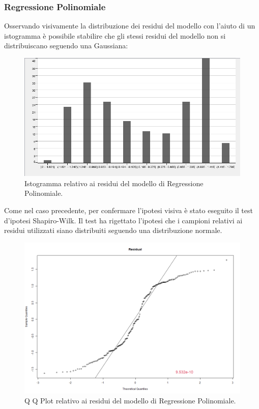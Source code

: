 \documentclass[12pt, a4paper, twocolumn]{article} %
\begin{document}
\subsubsection{Regressione Polinomiale}
Osservando visivamente la distribuzione dei residui del modello con l'aiuto di un istogramma è possibile stabilire che gli stessi residui del modello non si distribuiscano seguendo una Gaussiana:
\begin{figure}[H]
  \includegraphics[scale=0.35]{./Immagini/hist-polinomial-regression.png}
  \caption{Istogramma relativo ai residui del modello di Regressione Polinomiale.}
\end{figure}
Come nel caso precedente, per confermare l'ipotesi visiva è stato eseguito il test d'ipotesi Shapiro-Wilk. Il test ha rigettato l'ipotesi che i campioni relativi ai residui utilizzati siano distribuiti seguendo una distribuzione normale.
\begin{figure}[H]
  \includegraphics[scale=0.25]{./Immagini/qq-plot-polinomial-regression.png}
  \caption{Q Q Plot relativo ai residui del modello di Regressione Polinomiale.}
\end{figure}
\end{document}
